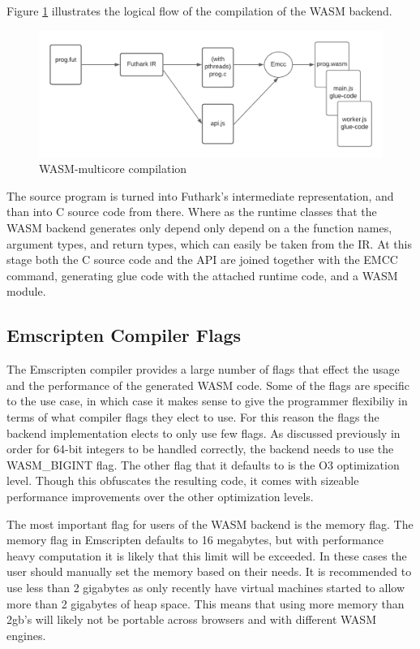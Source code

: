\documentclass[11pt]{book}
\begin{document}
Figure \ref{fig:wasm} illustrates the logical flow of the compilation of the WASM backend. 

\begin{figure}[htbp]
\centerline{\includegraphics[width=\textwidth]{figures/WASM_MC_compiler.png}}
\caption{WASM-multicore compilation}
\label{fig:wasm}
\end{figure}

The source program is turned into Futhark's intermediate representation, and than into C source code from there. Where as the runtime classes that the WASM backend generates only depend only depend on a the function names, argument types, and return types, which can easily be taken from the IR. At this stage both the C source code and the API are joined together with the EMCC command, generating glue code with the attached runtime code, and a WASM module. 

\subsection{Emscripten Compiler Flags}
The Emscripten compiler provides a large number of flags that effect the usage and the performance of the generated WASM code. Some of the flags are specific to the use case, in which case it makes sense to give the programmer flexibiliy in terms of what compiler flags they elect to use. For this reason the flags the backend implementation elects to only use few flags. As discussed previously in order for 64-bit integers to be handled correctly, the backend needs to use the WASM\_BIGINT flag. The other flag that it defaults to is the O3 optimization level. Though this obfuscates the resulting code, it comes with sizeable performance improvements over the other optimization levels.

The most important flag for users of the WASM backend is the memory flag. The memory flag in Emscripten defaults to 16 megabytes, but with performance heavy computation it is likely that this limit will be exceeded. In these cases the user should manually set the memory based on their needs. It is recommended to use less than 2 gigabytes as only recently have virtual machines started to allow more than 2 gigabytes of heap space. This means that using more memory than 2gb's will likely not be portable across browsers and with different WASM engines. 
\end{document}
